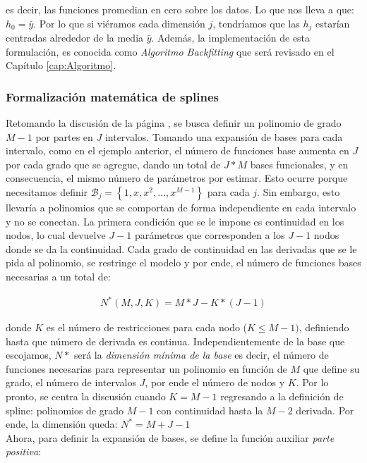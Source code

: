 \documentclass[../Main/Main.tex]{subfiles}
\begin{document}
es decir, las funciones promedian en cero sobre los datos. Lo que nos lleva a que: $h_0 = \bar{y}$. Por lo que si viéramos cada dimensión $j$, tendríamos que las $h_j$ estarían centradas alrededor de la media $\bar{y}$. Además, la implementación de esta formulación, es conocida como \textit{Algoritmo Backfitting} que será revisado en el Capítulo \ref{cap:Algoritmo}. \\

\subsubsection{Formalización matemática de splines}

Retomando la discusión de la página \pageref{sec:PolisYSplines}, se busca definir un polinomio de grado $M-1$ por partes en $J$ intervalos. Tomando una expansión de bases para cada intervalo, como en el ejemplo anterior, el número de funciones base aumenta en $J$ por cada grado que se agregue, dando un total de $J*M$ bases funcionales, y en consecuencia, el mismo número de parámetros por estimar. Esto ocurre porque necesitamos definir $\mathcal{B}_j = \left\{1,x,x^2,\ldots,x^{M-1}\right\}$ para cada $j$. Sin embargo, esto llevaría a polinomios que se comportan de forma independiente en cada intervalo y no se conectan. La primera condición que se le impone es continuidad en los nodos, lo cual  devuelve $J-1$ parámetros que corresponden a los $J-1$ nodos donde se da la continuidad. Cada grado de continuidad en las derivadas que se le pida al polinomio, se restringe el modelo y por ende, el número de funciones bases necesarias a un total de:

\begin{align}
	N^*(M,J,K) = M*J - K*(J-1) \label{ec:NEstrella}
\end{align}

donde $K$ es el número de restricciones para cada nodo ($K \leq M -1)$, definiendo hasta que número de derivada es continua. Independientemente de la base que escojamos, $N*$ será la \textit{dimensión mínima de la base} es decir, el número de funciones necesarias para representar un polinomio en función de $M$ que define su grado, el número de intervalos $J$, por ende el número de nodos y $K$. Por lo pronto, se centra la discusión cuando $K = M - 1$ regresando a la definición de spline: polinomios de grado $M-1$ con continuidad hasta la $M-2$ derivada. Por ende, la dimensión queda: $N^* = M + J - 1$\\

Ahora, para definir la expansión de bases, se define la función auxiliar \textit{parte positiva}:
\end{document}
